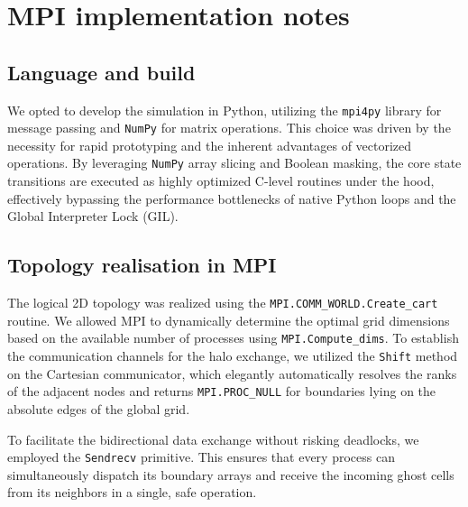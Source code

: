 \section{MPI implementation notes}

\subsection{Language and build}
We opted to develop the simulation in Python, utilizing the \texttt{mpi4py} library for message passing and \texttt{NumPy} for matrix operations. This choice was driven by the necessity for rapid prototyping and the inherent advantages of vectorized operations. By leveraging \texttt{NumPy} array slicing and Boolean masking, the core state transitions are executed as highly optimized C-level routines under the hood, effectively bypassing the performance bottlenecks of native Python loops and the Global Interpreter Lock (GIL).

\subsection{Topology realisation in MPI}
The logical 2D topology was realized using the \texttt{MPI.COMM\_WORLD.Create\_cart} routine. We allowed MPI to dynamically determine the optimal grid dimensions based on the available number of processes using \texttt{MPI.Compute\_dims}. To establish the communication channels for the halo exchange, we utilized the \texttt{Shift} method on the Cartesian communicator, which elegantly automatically resolves the ranks of the adjacent nodes and returns \texttt{MPI.PROC\_NULL} for boundaries lying on the absolute edges of the global grid.

To facilitate the bidirectional data exchange without risking deadlocks, we employed the \texttt{Sendrecv} primitive. This ensures that every process can simultaneously dispatch its boundary arrays and receive the incoming ghost cells from its neighbors in a single, safe operation.